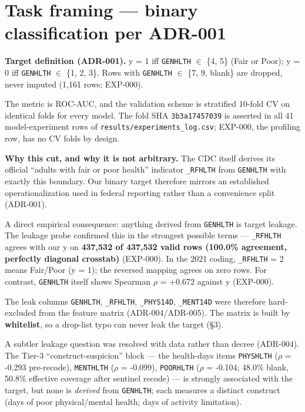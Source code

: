 \documentclass[11pt,a4paper]{article}
\begin{document}
\section{Task framing --- binary classification per
ADR-001}\label{task-framing-binary-classification-per-adr-001}

\textbf{Target definition (ADR-001).} y = 1 iff \texttt{GENHLTH} $\in$ \{4,
5\} (Fair or Poor); y = 0 iff \texttt{GENHLTH} $\in$ \{1, 2, 3\}. Rows with
\texttt{GENHLTH} $\in$ \{7, 9, blank\} are dropped, never imputed (1,161
rows; EXP-000).

The metric is ROC-AUC, and the validation scheme is stratified 10-fold
CV on identical folds for every model. The fold SHA
\texttt{3b3a17457039} is asserted in all 41 model-experiment rows of
\texttt{results/experiments\_log.csv}; EXP-000, the profiling row, has
no CV folds by design.

\textbf{Why this cut, and why it is not arbitrary.} The CDC itself
derives its official ``adults with fair or poor health'' indicator
\texttt{\_RFHLTH} from \texttt{GENHLTH} with exactly this boundary. Our
binary target therefore mirrors an established operationalization used
in federal reporting rather than a convenience split (ADR-001).

A direct empirical consequence: anything derived from \texttt{GENHLTH}
is target leakage. The leakage probe confirmed this in the strongest
possible terms --- \texttt{\_RFHLTH} agrees with our y on
\textbf{437,532 of 437,532 valid rows (100.0\% agreement, perfectly
diagonal crosstab)} (EXP-000). In the 2021 coding, \texttt{\_RFHLTH} = 2
means Fair/Poor (y = 1); the reversed mapping agrees on zero rows. For
contrast, \texttt{GENHLTH} itself shows Spearman $\rho$ = +0.672 against y
(EXP-000).

The leak columns \texttt{GENHLTH}, \texttt{\_RFHLTH},
\texttt{\_PHYS14D}, \texttt{\_MENT14D} were therefore hard-excluded from
the feature matrix (ADR-004/ADR-005). The matrix is built by
\textbf{whitelist}, so a drop-list typo can never leak the target (\S{}3).

A subtler leakage question was resolved with data rather than decree
(ADR-004). The Tier-3 ``construct-suspicion'' block --- the health-days
items \texttt{PHYSHLTH} ($\rho$ = -0.293 pre-recode), \texttt{MENTHLTH} ($\rho$ =
-0.099), \texttt{POORHLTH} ($\rho$ = -0.104; 48.0\% blank, 50.8\% effective
coverage after sentinel recode) --- is strongly associated with the
target, but none is \emph{derived} from \texttt{GENHLTH}; each measures
a distinct construct (days of poor physical/mental health; days of
activity limitation).
\end{document}
